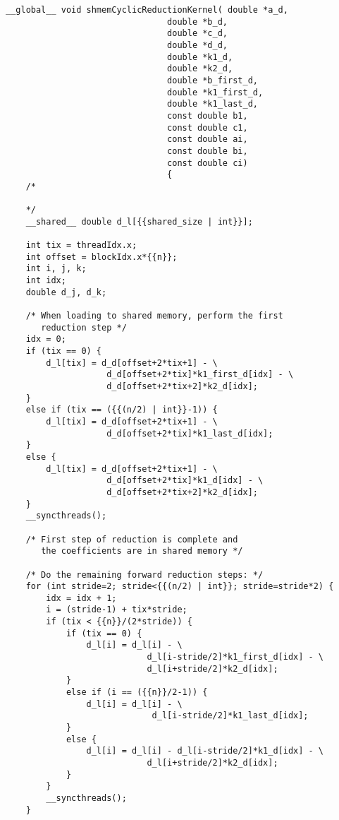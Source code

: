 \begin{verbatim}
__global__ void shmemCyclicReductionKernel( double *a_d,
                                double *b_d,
                                double *c_d,
                                double *d_d,
                                double *k1_d,
                                double *k2_d,
                                double *b_first_d,
                                double *k1_first_d,
                                double *k1_last_d,
                                const double b1,
                                const double c1,
                                const double ai,
                                const double bi,
                                const double ci)
                                {
    /*

    */
    __shared__ double d_l[{{shared_size | int}}];

    int tix = threadIdx.x; 
    int offset = blockIdx.x*{{n}};
    int i, j, k;
    int idx;
    double d_j, d_k;

    /* When loading to shared memory, perform the first
       reduction step */
    idx = 0;
    if (tix == 0) {
        d_l[tix] = d_d[offset+2*tix+1] - \
                    d_d[offset+2*tix]*k1_first_d[idx] - \
                    d_d[offset+2*tix+2]*k2_d[idx];
    }
    else if (tix == ({{(n/2) | int}}-1)) {
        d_l[tix] = d_d[offset+2*tix+1] - \
                    d_d[offset+2*tix]*k1_last_d[idx];
    }
    else {
        d_l[tix] = d_d[offset+2*tix+1] - \
                    d_d[offset+2*tix]*k1_d[idx] - \
                    d_d[offset+2*tix+2]*k2_d[idx];
    }
    __syncthreads();
    
    /* First step of reduction is complete and 
       the coefficients are in shared memory */
    
    /* Do the remaining forward reduction steps: */
    for (int stride=2; stride<{{(n/2) | int}}; stride=stride*2) {
        idx = idx + 1;
        i = (stride-1) + tix*stride;
        if (tix < {{n}}/(2*stride)) {
            if (tix == 0) {
                d_l[i] = d_l[i] - \
                            d_l[i-stride/2]*k1_first_d[idx] - \
                            d_l[i+stride/2]*k2_d[idx];
            }
            else if (i == ({{n}}/2-1)) {
                d_l[i] = d_l[i] - \
                             d_l[i-stride/2]*k1_last_d[idx];
            }
            else {
                d_l[i] = d_l[i] - d_l[i-stride/2]*k1_d[idx] - \
                            d_l[i+stride/2]*k2_d[idx];
            }
        }
        __syncthreads();
    }


\end{verbatim}
